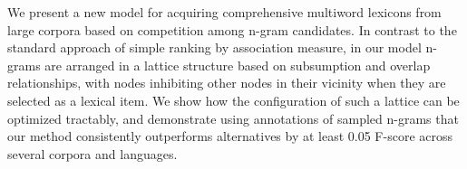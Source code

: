 We present a new model for acquiring comprehensive multiword lexicons from large corpora based on competition among n-gram candidates. In contrast to the standard approach of simple ranking by association measure, in our model n-grams are arranged in a lattice structure based on subsumption and overlap relationships, with nodes inhibiting other nodes in their vicinity when they are selected as a lexical item. We show how the configuration of such a lattice can be optimized tractably, and demonstrate using annotations of sampled n-grams that our method consistently outperforms alternatives by at least 0.05 F-score across several corpora and languages.
